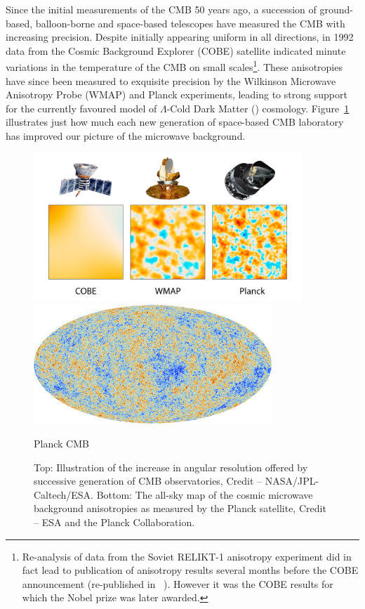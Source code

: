 Since the initial measurements of the CMB 50 years ago, a succession of ground-based, balloon-borne and space-based telescopes have measured the CMB with increasing precision. Despite initially appearing uniform in all directions, in 1992 data from the Cosmic Background Explorer (COBE) satellite indicated minute variations in the temperature of the CMB on small scales\footnote{Re-analysis of data from the Soviet RELIKT-1 anisotropy experiment did in fact lead to publication of anisotropy results several months before the COBE announcement (re-published in \citeauthor{Strukov:1992ua}~\citeyear{Strukov:1992ua}). However it was the COBE results for which the Nobel prize was later awarded.}. These anisotropies have since been measured to exquisite precision by the Wilkinson Microwave Anisotropy Probe (WMAP) and Planck experiments, leading to strong support for the currently favoured model of $\Lambda$-Cold Dark Matter (\cdm{}) cosmology. Figure~\ref{fig:cmb_comparison} illustrates just how much each new generation of space-based CMB laboratory has improved our picture of the microwave background.

\begin{figure}[!hb]
	\centering
	\includegraphics[width=0.9\textwidth]{CobeWmapPlanckComparison.jpg}

	\vspace{0.5in}
		
	\includegraphics[width=0.8\textwidth]{Planck_CMB.jpg}
	
	{\sffamily Planck CMB}
	\caption[The Cosmic Microwave Background anisotropy.]{Top: Illustration of the increase in angular resolution offered by successive generation of CMB observatories, Credit -- NASA/JPL-Caltech/ESA. Bottom: The all-sky map of the cosmic microwave background anisotropies as measured by the Planck satellite, Credit -- ESA and the Planck Collaboration.}
	\label{fig:cmb_comparison}
\end{figure}

